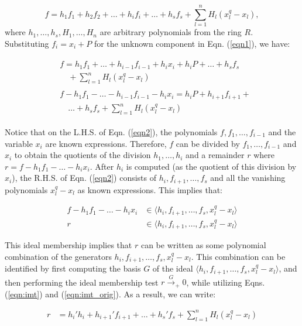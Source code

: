 \begin{equation}\label{eqn1}
f = h_1f_1 + h_2f_2 + \dots+h_if_i+\dots+h_sf_s + \sum_{l=1}^n H_l
(x_l^q-x_l),
\end{equation}
where $h_1,\dots,h_s,H_1,\dots,H_n$ are arbitrary polynomials from the ring
$R$. Substituting $f_i = x_i + P$ for the unknown component in
Eqn. (\ref{eqn1}), we have: 

\begin{eqnarray}
  \begin{split}
    & f  = h_1f_1 +\dots+h_{i-1}f_{i-1}+h_ix_i+h_iP+\dots+h_sf_s\\
    & \quad +\sum_{l=1}^n H_l (x_l^q-x_l)
  \end{split}\\  
  \begin{split}
    & f - h_1f_1 -\dots-h_{i-1}f_{i-1}-h_ix_i = h_iP+h_{i+1}f_{i+1}+\\
    & \quad \dots+h_sf_s +\sum_{l=1}^n H_l (x_l^q-x_l) \label{eqn2}
\end{split}
\end{eqnarray}

Notice that on the L.H.S. of Eqn. (\ref{eqn2}), the polynomials $f,
f_1,\dots,f_{i-1}$ and the variable $x_i$ are known
expressions. Therefore, $f$ can be divided by $f_1,\dots,f_{i-1}$ and
$x_i$ to obtain the quotients of the division $h_1,\dots,h_i$ and a
remainder $r$ where $r = f - h_1f_1 - \dots-h_ix_i$.
After $h_i$ is computed (as the quotient of this division by $x_i$), 
the R.H.S. of Eqn. (\ref{eqn2}) consists of $h_i, f_{i+1}, \dots, f_s$
and all the vanishing polynomials $x_l^q-x_l$ as known
expressions. This implies that: 

\begin{eqnarray}
f - h_1f_1 - \dots-h_ix_i & \in \langle h_i,f_{i+1},\dots,f_s,  x_l^q-x_l\rangle\\
r & \in \langle h_i,f_{i+1},\dots,f_s, x_l^q-x_l\rangle\label{eqn3}
\end{eqnarray}

This ideal membership implies that $r$ can be written as some
polynomial combination of the generators $h_i,f_{i+1},\dots,f_s,
x_l^q-x_l$. This combination can be identified by first computing the
\Grobner basis $G$ of the ideal $\langle
h_i,f_{i+1},\dots,f_s,x_l^q-x_l\rangle$, and then performing the ideal
membership test $r\xrightarrow{G}_+0$, while utilizing
Eqns. (\ref{eqn:imt}) and (\ref{eqn:imt_orig}). As a result, we can
write:

\begin{align}
r & = h_i'h_i+h_{i+1}'f_{i+1}+\dots+h_s'f_s+ \sum_{l=1}^n H_l (x_l^q-x_l)
\end{align}

